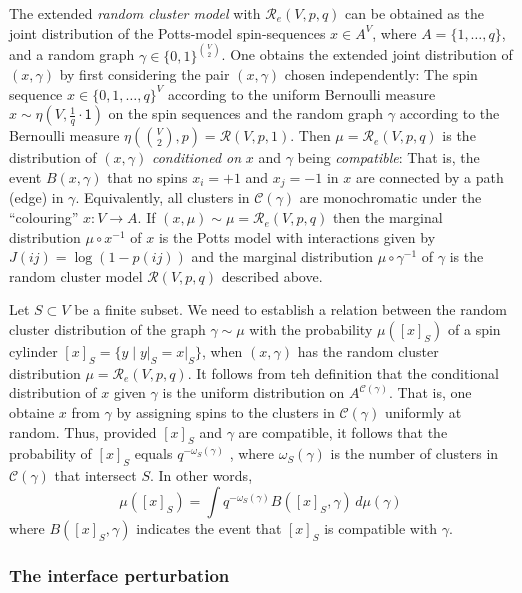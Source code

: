 \documentclass[11pt, a4paper]{amsart}
\theoremstyle{definition}
\theoremstyle{remark}
\renewcommand{\d}{\,d}
\providecommand{\mscr}{\mathscr}
\providecommand{\ett}{\mathsf{1}}
\providecommand{\g}{\gamma}
\providecommand{\w}{\omega}
\begin{document}
The extended \emph{random cluster model} with $\mscr R_e(V,p,q)$ can be obtained
as the joint distribution of the Potts-model spin-sequences $x\in A^{V}$, where
$A=\{1,\dots,q\}$, and a random graph $\gamma\in\{0,1\}^{\binom V2}$. One obtains the
extended joint distribution of $(x,\gamma)$ by first considering the pair $(x,\gamma)$
chosen independently: The spin sequence $x\in\{0,1,\dots,q\}^{V}$ according to the
uniform Bernoulli measure $x\sim\eta(V,\frac1q\cdot\ett)$ on the spin sequences and the
random graph $\gamma$ according to the Bernoulli measure
$\eta(\binom V2, p)=\mscr R(V,p,1)$. Then $\mu=\mscr R_e(V,p,q)$ is the distribution
of $(x,\gamma)$ \emph{conditioned on} $x$ and $\gamma$ being \emph{compatible}: That is,
the event $B(x,\gamma)$ that no spins $x_i=+1$ and $x_j=-1$ in $x$ are connected by a
path (edge) in $\gamma$. Equivalently, all clusters in $\mscr C(\g)$ are
monochromatic under the ``colouring'' $x:V \to A$. If $(x,\mu)\sim\mu=\mscr R_e(V,p,q)$
then the marginal distribution $\mu\circ x^{-1}$ of $x$ is the Potts model with
interactions given by $J(ij)=\log(1-p(ij))$ and the marginal distribution
$\mu\circ\gamma^{-1}$ of $\gamma$ is the random cluster model $\mscr R(V,p,q)$ described above.

Let $S\subset V$ be a finite subset. We need to establish a relation between the
random cluster distribution of the graph $\gamma\sim\mu$ with the probability $\mu([x]_S)$
of a spin cylinder $[x]_S = \{y \mid y\vert_S = x\vert_S\}$, when $(x,\gamma)$ has the random
cluster distribution $\mu = \mathscr R_e(V,p,q)$. It follows from teh definition
that the conditional distribution of $x$ given $\gamma$ is the uniform distribution
on $A^{\mscr C(\gamma)}$. That is, one obtaine $x$ from $\g$ by assigning spins to
the clusters in $\mscr C(\g)$ uniformly at random. Thus, provided $[x]_S$ and
$\gamma$ are compatible, it follows that the probability of $[x]_S$ equals
$q^{-\w_S(\gamma)}$ , where $\w_S(\gamma)$ is the number of clusters in $\mscr C(\gamma)$ that
intersect $S$. In other words,
\begin{equation}\label{eq:gcyl}
  \mu([x]_S) = \int q^{-\w_S(\gamma)} B([x]_S,\gamma) \d\mu(\gamma)
\end{equation}
where $B([x]_S,\gamma)$ indicates the event that $[x]_S$ is compatible with $\gamma$.


\subsubsection{The interface perturbation}
\end{document}

